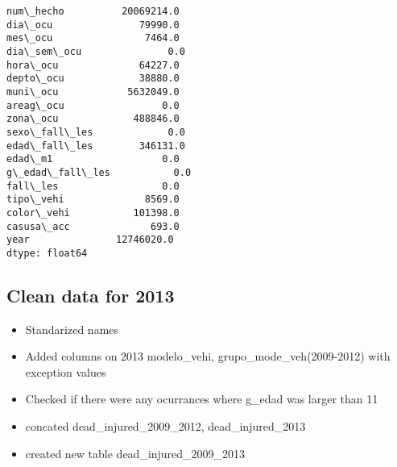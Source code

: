 \documentclass[11pt]{article}
\providecommand{\tightlist}{%
      \setlength{\itemsep}{0pt}\setlength{\parskip}{0pt}}
\begin{document}
    \begin{Verbatim}[commandchars=\\\{\}]
num\_hecho          20069214.0
dia\_ocu               79990.0
mes\_ocu                7464.0
dia\_sem\_ocu               0.0
hora\_ocu              64227.0
depto\_ocu             38880.0
muni\_ocu            5632049.0
areag\_ocu                 0.0
zona\_ocu             488846.0
sexo\_fall\_les             0.0
edad\_fall\_les        346131.0
edad\_m1                   0.0
g\_edad\_fall\_les           0.0
fall\_les                  0.0
tipo\_vehi              8569.0
color\_vehi           101398.0
casusa\_acc              693.0
year               12746020.0
dtype: float64

    \end{Verbatim}

    \hypertarget{clean-data-for-2013}{%
\subsection{Clean data for 2013}\label{clean-data-for-2013}}

\begin{itemize}
\tightlist
\item
  Standarized names
\item
  Added columns on 2013 modelo\_vehi, grupo\_mode\_veh(2009-2012) with
  exception values
\item
  Checked if there were any ocurrances where g\_edad was larger than 11
\item
  concated dead\_injured\_2009\_2012, dead\_injured\_2013
\item
  created new table dead\_injured\_2009\_2013
\end{itemize}
\end{document}
